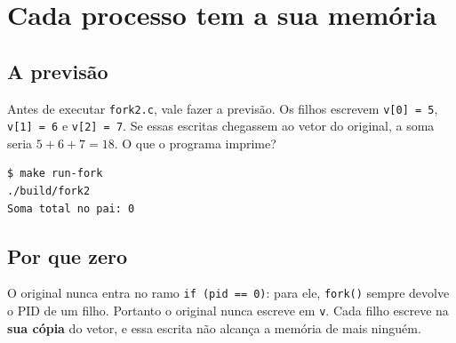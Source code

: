 \documentclass[11pt,a4paper]{article}
\newcommand{\cmd}[1]{\texttt{#1}}
\begin{document}
\section{Cada processo tem a sua memória}\label{sec:memoria}

\subsection{A previsão}

Antes de executar \cmd{fork2.c}, vale fazer a previsão. Os filhos escrevem \cmd{v[0] = 5}, \cmd{v[1] = 6} e \cmd{v[2] = 7}. Se essas escritas chegassem ao vetor do original, a soma seria $5 + 6 + 7 = 18$. O que o programa imprime?

\begin{lstlisting}[style=terminal]
$ make run-fork
./build/fork2
Soma total no pai: 0
\end{lstlisting}

\subsection{Por que zero}

O original nunca entra no ramo \cmd{if (pid == 0)}: para ele, \cmd{fork()} sempre devolve o PID de um filho. Portanto o original nunca escreve em \cmd{v}. Cada filho escreve na \textbf{sua cópia} do vetor, e essa escrita não alcança a memória de mais ninguém.

\begin{center}
\end{center}
\end{document}
